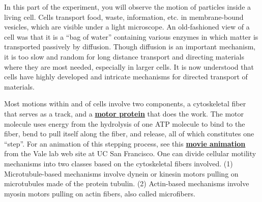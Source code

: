 \documentclass{../lab}
\begin{document}
In this part of the experiment, you will observe the motion of particles inside a living cell. Cells transport food, waste, information, etc. in membrane-bound vesicles, which are visible under a light microscope. An old-fashioned view of a cell was that it is a ``bag of water'' containing various enzymes in which matter is transported passively by diffusion. Though diffusion is an important mechanism, it is too slow and random for long distance transport and directing materials where they are most needed, especially in larger cells. It is now understood that cells have highly developed and intricate mechanisms for directed transport of materials.

Most motions within and of cells involve two components, a cytoskeletal fiber that serves as a track, and a \href{http://en.wikipedia.org/wiki/Motor\_protein}{\textbf{motor protein}} that does the work. The motor molecule uses energy from the hydrolysis of one ATP molecule to bind to the fiber, bend to pull itself along the fiber, and release, all of which constitutes one ``step''. For an animation of this stepping process, see this \href{https://valelab.ucsf.edu/molecular-animations/}{\textbf{movie animation}} from the Vale lab web site at UC San Francisco. One can divide cellular motility mechanisms into two classes based on the cytoskeletal fibers involved. (1) Microtubule-based mechanisms involve dynein or kinesin motors pulling on microtubules made of the protein tubulin. (2) Actin-based mechanisms involve myosin motors pulling on actin fibers, also called microfibers.
\end{document}
